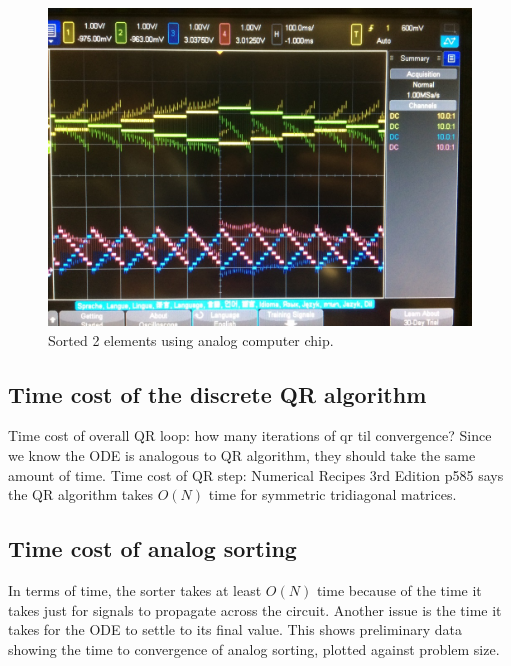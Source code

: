 \begin{figure}[h]
\centering
\includegraphics[width=\columnwidth]{graphics/2d_analog.jpg}
\caption{Sorted 2 elements using analog computer chip.}
\end{figure}

 

\subsection{Time cost of the discrete QR algorithm}
Time cost of overall QR loop:
	how many iterations of qr til convergence?
	Since we know the ODE is analogous to QR algorithm, they should take the same amount of time.
Time cost of QR step:
	Numerical Recipes 3rd Edition p585 says the QR algorithm takes $O(N)$ time for symmetric tridiagonal matrices.

\subsection{Time cost of analog sorting}

In terms of time, the sorter takes at least $O(N)$ time because of the time it takes just for signals to propagate across the circuit.
Another issue is the time it takes for the ODE to settle to its final value.
This shows preliminary data showing the time to convergence of analog sorting, plotted against problem size.

